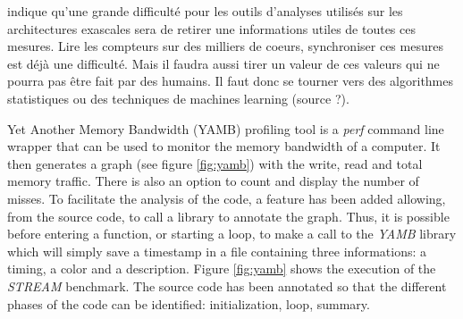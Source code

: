   \cite{Straatsma2017} indique qu’une grande difficulté pour les outils d’analyses utilisés sur les architectures exascales sera de retirer une informations utiles de toutes ces mesures. Lire les compteurs sur des milliers de coeurs, synchroniser ces mesures est déjà une difficulté. Mais il faudra aussi tirer un valeur de ces valeurs qui ne pourra pas être fait par des humains. Il faut donc se tourner vers des algorithmes statistiques ou des techniques de machines learning (source ?).



Yet Another Memory Bandwidth (YAMB) profiling tool is a \textit{perf} command line wrapper that can be used to monitor the memory bandwidth of a computer. It then generates a graph (see figure \autoref{fig:yamb}) with the write, read and total memory traffic. There is also an option to count and display the number of misses. To facilitate the analysis of the code, a feature has been added allowing, from the source code, to call a library to annotate the graph. Thus, it is possible before entering a function, or starting a loop, to make a call to the \textit{YAMB} library which will simply save a timestamp in a file containing three informations: a timing, a color and a description. Figure \autoref{fig:yamb} shows the execution of the \textit{STREAM} benchmark. The source code has been annotated so that the different phases of the code can be identified: initialization, loop, summary.
